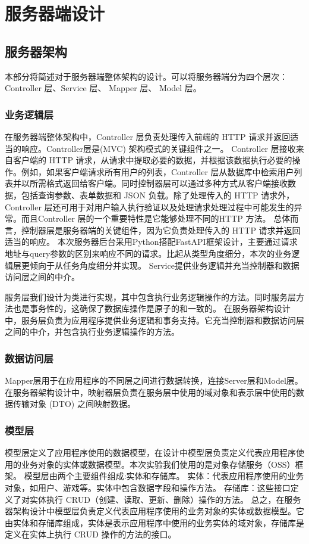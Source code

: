 \documentclass[12pt]{ctexart} %
\begin{document}
\section{服务器端设计}

\subsection{服务器架构}
本部分将简述对于服务器端整体架构的设计。可以将服务器端分为四个层次：Controller 层、Service 层、 Mapper 层、 Model 层。
\subsubsection{业务逻辑层}
在服务器端整体架构中，Controller 层负责处理传入前端的 HTTP 请求并返回适当的响应。Controller层是(MVC) 架构模式的关键组件之一。
Controller 层接收来自客户端的 HTTP 请求，从请求中提取必要的数据，并根据该数据执行必要的操作。例如，如果客户端请求所有用户的列表，Controller 层从数据库中检索用户列表并以所需格式返回给客户端。同时控制器层可以通过多种方式从客户端接收数据，包括查询参数、表单数据和 JSON 负载。除了处理传入的 HTTP 请求外，Controller 层还可用于对用户输入执行验证以及处理请求处理过程中可能发生的异常。而且Controller 层的一个重要特性是它能够处理不同的HTTP 方法。
总体而言，控制器层是服务器端的关键组件，因为它负责处理传入的 HTTP 请求并返回适当的响应。
本次服务器后台采用Python搭配FastAPI框架设计，主要通过请求地址与query参数的区别来响应不同的请求。比起从类型角度细分，本次的业务逻辑层更倾向于从任务角度细分并实现。
Service提供业务逻辑并充当控制器和数据访问层之间的中介。

服务层我们设计为类进行实现，其中包含执行业务逻辑操作的方法。同时服务层方法也是事务性的，这确保了数据库操作是原子的和一致的。
在服务器架构设计中，服务层负责为应用程序提供业务逻辑和事务支持。它充当控制器和数据访问层之间的中介，并包含执行业务逻辑操作的方法。

\subsubsection{数据访问层}

Mapper层用于在应用程序的不同层之间进行数据转换，连接Server层和Model层。
在服务器架构设计中，映射器层负责在服务层中使用的域对象和表示层中使用的数据传输对象 (DTO) 之间映射数据。
\subsubsection{模型层}

模型层定义了应用程序使用的数据模型，在设计中模型层负责定义代表应用程序使用的业务对象的实体或数据模型。本次实验我们使用的是对象存储服务（OSS）框架。
模型层由两个主要组件组成:实体和存储库。
实体：代表应用程序使用的业务对象，如用户、游戏等。实体中包含数据字段和操作方法。
存储库：这些接口定义了对实体执行 CRUD（创建、读取、更新、删除）操作的方法。
总之，在服务器架构设计中模型层负责定义代表应用程序使用的业务对象的实体或数据模型。它由实体和存储库组成，实体是表示应用程序中使用的业务实体的域对象，存储库是定义在实体上执行 CRUD 操作的方法的接口。
\end{document}
